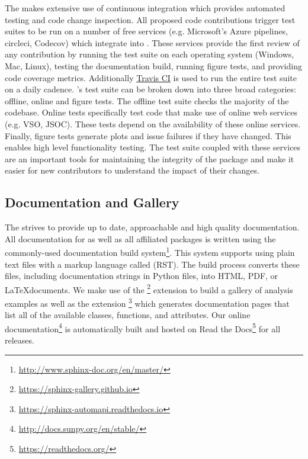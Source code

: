 The \sunpyproj makes extensive use of continuous integration which provides automated testing and code change inspection.
All proposed code contributions trigger test suites to be run on a number of free services (e.g.
Microsoft's Azure pipelines, circleci, Codecov) which integrate into \github.
These services provide the first review of any contribution by running the test suite on each operating system (Windows, Mac, Linux), testing the documentation build, running figure tests, and providing code coverage metrics.
Additionally \href{https://travis-ci.org}{Travis CI} is used to run the entire test suite on a daily cadence.
\sunpypkg's test suite can be broken down into three broad categories: offline, online and figure tests.
The offline test suite checks the majority of the codebase.
Online tests specifically test code that make use of online web services (e.g. VSO, JSOC).
These tests depend on the availability of these online services.
Finally, figure tests generate plots and issue failures if they have changed.
This enables high level functionality testing.
The \sunpypkg test suite coupled with these services are an important tools for maintaining the integrity of the package and make it easier for new contributors to understand the impact of their changes.

\subsection{Documentation and Gallery}
\label{sec:docs}

The \sunpyproj strives to provide up to date, approachable and high quality documentation.
All documentation for \sunpypkg as well as all affiliated packages is written using the commonly-used  documentation build system\footnote{\url{http://www.sphinx-doc.org/en/master/}}.
This system supports using plain text files with a markup language called  (RST).
The build process converts these files, including documentation strings in Python files, into HTML, PDF, or \LaTeX documents.
We make use of the \footnote{\url{https://sphinx-gallery.github.io}} extension to build a gallery of analysis examples as well as the extension \footnote{\url{https://sphinx-automapi.readthedocs.io}} which generates documentation pages that list all of the available classes, functions, and attributes.
Our online documentation\footnote{\url{http://docs.sunpy.org/en/stable/}} is automatically built and hosted on Read the Docs\footnote{\url{https://readthedocs.org/}} for all releases.
